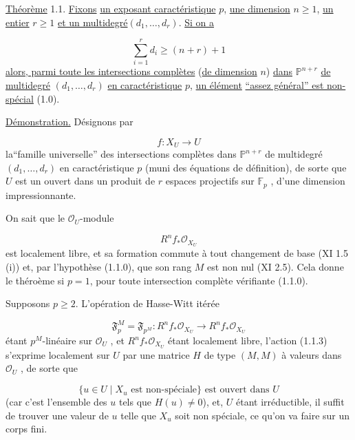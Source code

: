 \underline{Théorème} 1.1. \underline{Fixons} \underline{un exposant caractéristique} $p$, \underline{une dimension} $n \geq 1$, \underline{un entier} $r \geq 1$ \underline{et un multidegré}$(d_1,\dots,d_r)$. \underline{Si on a}

\begin{equation}\tag{1.1.0}
\sum_{i=1}^{r} d_i \geq (n+r)+1
\end{equation}
\underline{alors, parmi toute les intersections complètes} (\underline{de dimension} $n$) \underline{dans} $\mathbb{P}^{n+r}$ \underline{de multidegré} $(d_1,\dots,d_r)$ \underline{en caractéristique} $p$, \underline{un élément} \underline{``assez général'' est non-spécial} (1.0).

\underline{Démonstration.} Désignons par

\begin{equation}\tag{1.1.1}
f : X_U \longrightarrow U
\end{equation}
la``famille universelle'' des intersections complètes dans $\mathbb{P}^{n+r}$ de
multidegré $(d_1,\dots,d_r)$ en caractéristique $p$ (muni des équations de définition), de sorte que $U$ est un ouvert dans un produit de $r$ espaces projectifs sur $\mathbb{F}_p$ , d'une dimension impressionnante.

On sait que le $\mathcal{O}_U$-module

\begin{equation}\tag{1.1.2}
R^n f_* \mathcal{O}_{X_U}
\end{equation}
est localement libre, et sa formation commute à tout changement de base (XI 1.5 (i)) et, par l'hypothèse (1.1.0), que son rang $M$ est non nul (XI 2.5). Cela donne le théroème si $p = 1$, pour toute intersection complète vérifiante (1.1.0).

Supposons $p \geq 2$. L'opération de Hasse-Witt itérée

\begin{equation}\tag{1.1.3}
\mathfrak{F}_p^M = \mathfrak{F}_{p^M} : R^n f_* \mathcal{O}_{X_U} \longrightarrow R^n f_* \mathcal{O}_{X_U}
\end{equation}
étant $p^M$-linéaire sur $\mathcal{O}_U$ , et $R^n f_* \mathcal{O}_{X_U}$ étant localement libre, l'action (1.1.3) s'exprime localement sur $U$ par une matrice $H$ de type $(M,M)$ à valeurs dans $\mathcal{O}_U$ , de sorte que

\begin{equation}\tag{1.1.4}
\{ u \in U \mid X_u \mbox{ est non-spéciale}\} \mbox{ est ouvert dans } U
\end{equation}
(car c'est l'ensemble des $u$ tels que $H(u) \neq 0$), et, $U$ étant irréductible, il suffit de trouver une valeur de $u$ telle que $X_u$ soit non spéciale, ce qu'on va faire sur un corps fini.

